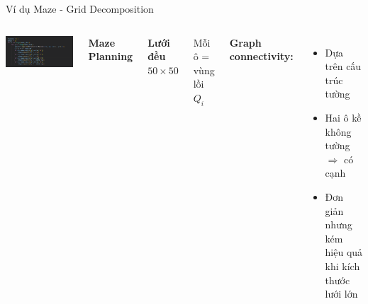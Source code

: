 \documentclass[aspectratio=169]{beamer}
\begin{document}
\begin{frame}{Ví dụ Maze - Grid Decomposition}
    \begin{columns}[c]
        \includegraphics[width=\textwidth]{../imgs/maze-decompose.png}

        \textbf{Maze Planning}
        
        \textbf{Lưới đều $50 \times 50$}

        \vspace{0.3cm}
        Mỗi ô = vùng lồi $Q_i$

        \vspace{0.3cm}
        \textbf{Graph connectivity:}
        \begin{itemize}
            \item Dựa trên cấu trúc tường
            \item Hai ô kề không tường $\Rightarrow$ có cạnh
            \item Đơn giản nhưng kém hiệu quả khi kích thước lưới lớn
        \end{itemize}
    \end{columns}
\end{frame}
\end{document}
